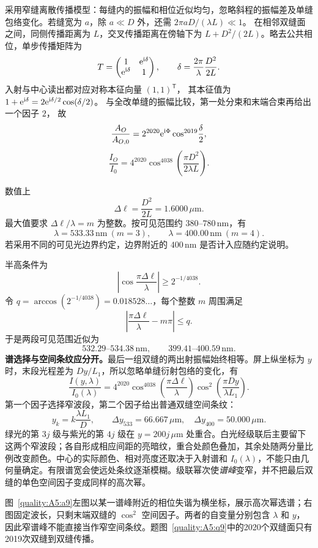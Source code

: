 \begin{advsolution}
采用窄缝离散传播模型：每缝内的振幅和相位近似均匀，忽略斜程的振幅差及单缝包络变化。若缝宽为 $a$，除 $a\ll D$ 外，还需 $2\pi aD/(\lambda L)\ll1$。
在相邻双缝面之间，同侧传播距离为 $L$，交叉传播距离在傍轴下为
$L+D^2/(2L)$。略去公共相位，单步传播矩阵为
\[
 T=\begin{pmatrix}1&\mathrm e^{\mathrm i\delta}\\
 \mathrm e^{\mathrm i\delta}&1\end{pmatrix},\qquad
 \delta=\frac{2\pi}{\lambda}\frac{D^2}{2L}.
\]
入射与中心读出都对应对称本征向量 $(1,1)^{\mathsf T}$，
其本征值为 $1+\mathrm e^{\mathrm i\delta}
=2\mathrm e^{\mathrm i\delta/2}\cos(\delta/2)$。
与全改单缝的振幅比较，第一处分束和末端合束再给出一个因子 $2$，
故
\[
 \frac{A_O}{A_{O,0}}
 =2^{2020}\mathrm e^{\mathrm i\Phi}
 \cos^{2019}\!\frac{\delta}{2},
\]
\[
 \boxed{\frac{I_O}{I_0}
 =4^{2020}
 \cos^{4038}\!\left(\frac{\pi D^2}{2\lambda L}\right)}.
\]

数值上
\[
 \Delta\ell=\frac{D^2}{2L}=1.6000\,\mu\mathrm m.
\]
最大值要求 $\Delta\ell/\lambda=m$ 为整数。按可见范围约
$380$--$780\,\mathrm{nm}$，有
\[
 \boxed{\lambda=533.33\,\mathrm{nm}\ (m=3)},\qquad
 \boxed{\lambda=400.00\,\mathrm{nm}\ (m=4)}.
\]
若采用不同的可见光边界约定，边界附近的 $400\,\mathrm{nm}$ 是否计入应随约定说明。

半高条件为
\[
 \left|\cos\frac{\pi\Delta\ell}{\lambda}\right|
 \ge 2^{-1/4038}.
\]
令
$q=\arccos(2^{-1/4038})=0.018528\ldots$，每个整数 $m$ 周围满足
\[
 \left|\frac{\pi\Delta\ell}{\lambda}-m\pi\right|\le q.
\]
于是两段可见范围近似为
\[
 \boxed{532.29\text{--}534.38\,\mathrm{nm}},\qquad
 \boxed{399.41\text{--}400.59\,\mathrm{nm}}.
\]
\textbf{谱选择与空间条纹应分开。}最后一组双缝的两出射振幅始终相等。屏上纵坐标为 $y$ 时，末段光程差为 $Dy/L_1$，所以忽略单缝衍射包络的变化，有
\[
 \frac{I(y,\lambda)}{I_0(\lambda)}=
 4^{2020}\cos^{4038}\!\left(\frac{\pi\Delta\ell}{\lambda}\right)
 \cos^2\!\left(\frac{\pi Dy}{\lambda L_1}\right).
\]
第一个因子选择窄波段，第二个因子给出普通双缝空间条纹：
\[
 y_k=k\frac{\lambda L_1}{D},\qquad
 \Delta y_{533}=66.667\,\mu\mathrm m,\quad
 \Delta y_{400}=50.000\,\mu\mathrm m.
\]
绿光的第 $3j$ 级与紫光的第 $4j$ 级在 $y=200j\,\mu\mathrm m$ 处重合。白光经级联后主要留下这两个窄波段；各自形成相应间距的亮暗纹，重合处颜色叠加，其余处随两分量比例改变颜色。中心的实际颜色、相对亮度还取决于入射谱和 $I_0(\lambda)$，不能只由几何量确定。有限谱宽会使远处条纹逐渐模糊。级联幂次使\emph{谱峰}变窄，并不把最后双缝的单色空间因子变成同样的高次幂。


图~\ref{quality:A5:a9}左图以某一谱峰附近的相位失谐为横坐标，展示高次幂选谱；右图固定波长，只剩末端双缝的 $\cos^2$ 空间因子。两者的自变量分别包含 $\lambda$ 和 $y$，因此窄谱峰不能直接当作窄空间条纹。题图~\ref{quality:A5:q9}中的2020个双缝面只有2019次双缝到双缝传播。
\end{advsolution}

